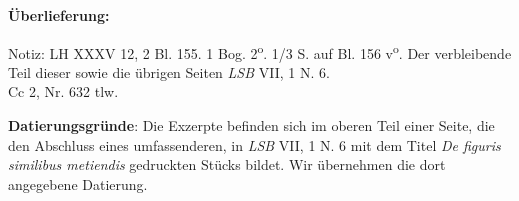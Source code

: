       
               
                \begin{ledgroupsized}[r]{120mm}
                \footnotesize 
                \pstart                
                \noindent\textbf{\"{U}berlieferung:}   
                \pend
                \end{ledgroupsized}
            
              
                            \begin{ledgroupsized}[r]{114mm}
                            \footnotesize 
                            \pstart \parindent -6mm
                            Notiz: LH XXXV 12, 2 Bl. 155. 1 Bog. 2\textsuperscript{o}. 1/3 S. auf Bl. 156 v\textsuperscript{o}. Der ver\-bleibende Teil dieser sowie die \"{u}brigen Seiten \textit{LSB} VII, 1 N. 6.\\Cc 2, Nr. 632 tlw. \pend
                            \end{ledgroupsized}
                \vspace*{5mm}
                \begin{ledgroup}
                \footnotesize 
                \pstart
            \noindent\footnotesize{\textbf{Datierungsgr\"{u}nde}: Die Exzerpte befinden sich im oberen Teil einer Seite, die den Abschluss eines umfassenderen, in \textit{LSB} VII, 1 N. 6 mit dem Titel \textit{De figuris similibus metiendis} gedruckten St\"{u}cks bildet. Wir \"{u}bernehmen die dort angegebene Datierung.}
                \pend
                \end{ledgroup}
            
